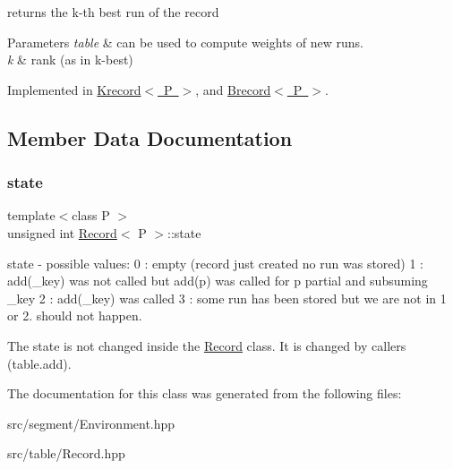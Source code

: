 returns the k-\/th best run of the record 


\begin{DoxyParams}{Parameters}
{\em table} & can be used to compute weights of new runs. \\
\hline
{\em k} & rank (as in k-\/best) \\
\hline
\end{DoxyParams}


Implemented in \mbox{\hyperlink{classKrecord_a3969af28b4979e3647c149e9f35f21b7}{Krecord$<$ P $>$}}, and \mbox{\hyperlink{classBrecord_a3e9776d16cdc2fd5c169d5599caf7c4b}{Brecord$<$ P $>$}}.



\subsection{Member Data Documentation}
\mbox{\label{classRecord_a9b17378a46d2026b86632728f820d804}} 
\subsubsection{\texorpdfstring{state}{state}}
{\footnotesize\ttfamily template$<$class P $>$ \\
unsigned int \mbox{\hyperlink{classRecord}{Record}}$<$ P $>$\+::state}



state -\/ possible values\+: 0 \+: empty (record just created no run was stored) 1 \+: add(\+\_\+key) was not called but add(p) was called for p partial and subsuming \+\_\+key 2 \+: add(\+\_\+key) was called 3 \+: some run has been stored but we are not in 1 or 2. should not happen. 

The state is not changed inside the \mbox{\hyperlink{classRecord}{Record}} class. It is changed by callers (table.\+add). 

The documentation for this class was generated from the following files\+:\begin{DoxyCompactItemize}
\item 
src/segment/Environment.\+hpp\item 
src/table/Record.\+hpp\end{DoxyCompactItemize}
